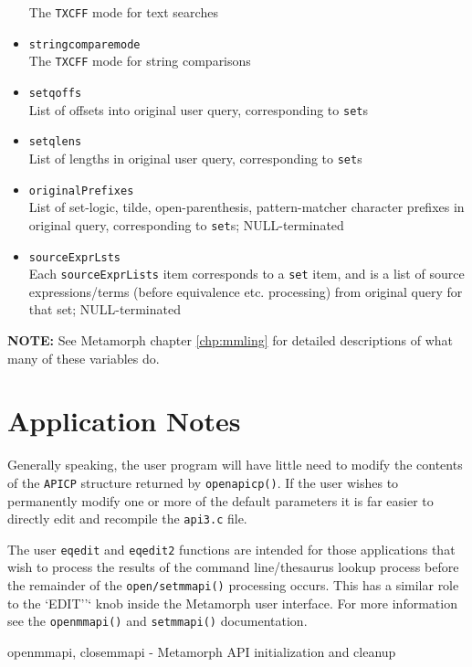 \begin{itemize}
    The \verb`TXCFF` mode for text searches
  \item \verb`stringcomparemode` \\
    The \verb`TXCFF` mode for string comparisons
  \item \verb`setqoffs` \\
    List of offsets into original user query, corresponding to \verb`set`s
  \item \verb`setqlens` \\
    List of lengths in original user query, corresponding to \verb`set`s
  \item \verb`originalPrefixes` \\
    List of set-logic, tilde, open-parenthesis, pattern-matcher
    character prefixes in original query, corresponding to
    \verb`set`s; NULL-terminated
  \item \verb`sourceExprLsts` \\
    Each \verb`sourceExprLists` item corresponds to a \verb`set` item,
    and is a list of source expressions/terms (before equivalence
    etc. processing) from original query for that set; NULL-terminated
\end{itemize}

{\bf NOTE: }  See Metamorph chapter \ref{chp:mmling} for detailed descriptions of
what many of these variables do.

\section{Application Notes}

Generally speaking, the user program will have little need to
modify the contents of the \verb`APICP` structure returned by
\verb`openapicp()`.  If the user wishes to permanently modify one or more
of the default parameters it is far easier to directly edit and
recompile the \verb`api3.c` file.

The user \verb`eqedit` and \verb`eqedit2` functions are intended for those
applications that wish to process the results of the command
line/thesaurus lookup process before the remainder of the
\verb`open/setmmapi()` processing occurs.  This has a similar role to the
\verb```EDIT''` knob inside the Metamorph user interface.  For more
information see the \verb`openmmapi()` and \verb`setmmapi()` documentation.

\NAME
{openmmapi, closemmapi - Metamorph API initialization and cleanup}

